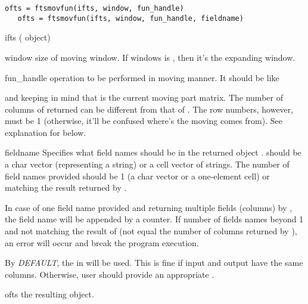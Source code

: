 \usage
   \begin{lstlisting}[numbers=none]
   ofts = ftsmovfun(ifts, window, fun_handle)
   ofts = ftsmovfun(ifts, window, fun_handle, fieldname)
   \end{lstlisting}
\inarg
   \begin{argdesc}
   \item[ifts] (\myfints{} object) 
   \item[window] size of moving window.
         If windows is , then it's the expanding window.
   \item[fun\_handle] operation to be performed in moving manner.
        It should be like \par
        \hspace{1.0cm}\par
        and keeping in mind that  is the current moving part matrix.
        The number of columns of returned 
        can be different from that of .
        The row numbers, however, must be 1
        (otherwise, it'll be confused where's the moving comes from).
        See explanation for  below.
   \item[fieldname] Specifies what field names should be in the returned
                 \myfints{} object .
                  should be a char vector (representing a string)
                 or a cell vector of strings. 
                 The number of field names provided should be 1 (a char
                 vector or a one-element cell) or matching the result
                 returned by . 

                 In case of one field name provided and returning 
                 multiple fields (columns) by , 
                 the field name will be appended by a counter.
                 If number of fields names beyond 1 and not matching the 
                 result of  (not equal the number of columns
                 returned by ), 
                 an error will occur and break the
                 program execution.

                 By \emph{DEFAULT}, 
                 the  in  will be used.
                 This is fine if input and output have the same columns.
                 Otherwise,
                 user should provide an appropriate .
   \end{argdesc}
\outarg
   \begin{argdesc}
   \item [ofts] the resulting \myfints{} object.
   \end{argdesc}

